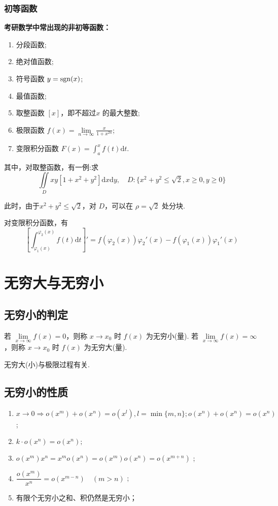 \subsubsection{初等函数}
\textbf{考研数学中常出现的非初等函数：}
\begin{enumerate}
    \item 分段函数;
    \item 绝对值函数;
    \item 符号函数 $ y={\rm sgn}(x) $;
    \item 最值函数;
    \item 取整函数 $ [x] $，即不超过$ x $ 的最大整数;
    \item 极限函数 $ f(x)=\lim\limits_{n\rightarrow\infty}\displaystyle\frac{x}{1+x^{2n}} $;
    \item 变限积分函数 $ F(x)=\int^{x}_{a} f(t)\mathrm{d}t $.
\end{enumerate}

其中，对取整函数，有一例:求
$$
    \iint\limits_{D}xy[1+x^2+y^2]\mathrm{d}x\mathrm{d}y,\quad{}
    D:\{x^2+y^2\leq\sqrt{2},x\geq0,y\geq0\}
$$ 

此时，由于$ x^2+y^2 \leq \sqrt{2} $，对 $ D $，可以在 $ \rho=\sqrt{2} $ 处分块.

对变限积分函数，有
$$
    \left[\int^{\varphi_2(x)}_{\varphi_1(x)}f(t)\mathrm{d}t\right]'=f(\varphi_2(x))\varphi_2'(x)-f(\varphi_1(x))\varphi_1'(x)
$$ 

\section{无穷大与无穷小}
\subsection{无穷小的判定}

若 $ \lim\limits_{x\rightarrow\infty}f(x)=0 $，则称 $ x\rightarrow x_0 $ 时 $ f(x) $ 
为无穷小(量).
若 $ \lim\limits_{x\rightarrow\infty}f(x)=\infty $，则称 $ x\rightarrow x_0 $ 时 $ f(x) $ 
为无穷大(量).

无穷大(小)与极限过程有关.

\subsection{无穷小的性质}

\begin{enumerate}
    \item $ x\rightarrow 0\Rightarrow o(x^m) + o(x^n) = o(x^l), l = \min\{m,n\}; o(x^n)+o(x^n) = o(x^n) $ ;
    \item $ k\cdot o(x^n) = o(x^n); $ 
    \item $ o(x^m)x^n = x^mo(x^n) = o(x^m)o(x^n) = o(x^{m+n}) $ ;
    \item $ \dfrac{o(x^m)}{x^n} = o(x^{m-n})\quad (m>n) $ ;
    \item 有限个无穷小之和、积仍然是无穷小；
\end{enumerate}

